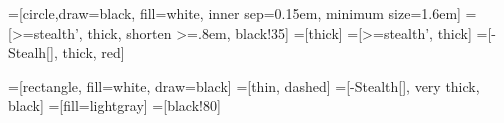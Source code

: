 \usetikzlibrary{arrows}

=[circle,draw=black, fill=white, inner sep=0.15em, minimum size=1.6em]
=[>=stealth', thick, shorten >=.8em, black!35]
=[thick]
=[>=stealth', thick]
=[{}-{Stealh[]}, thick, red]

=[rectangle, fill=white, draw=black]
=[thin, dashed]
=[-{Stealth[]}, very thick, black]
=[fill=lightgray]
=[black!80]

